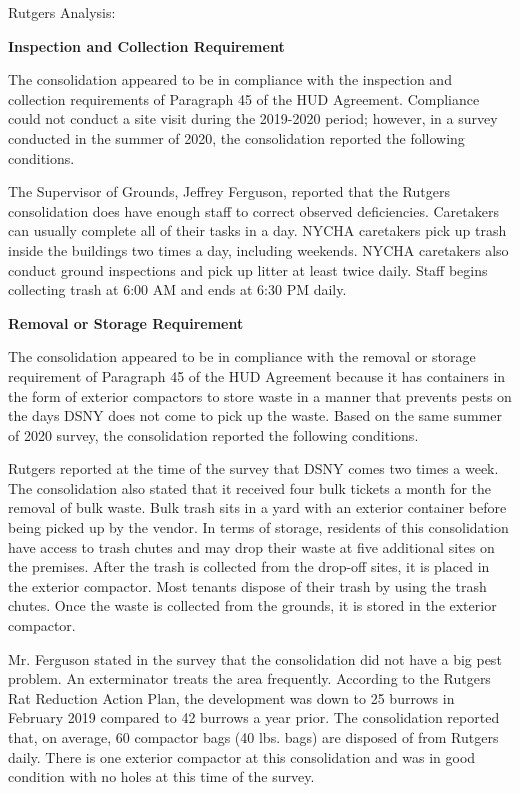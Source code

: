 Rutgers Analysis: 

\textbf{Inspection and Collection Requirement} 

 

The consolidation appeared to be in compliance with the inspection and collection requirements of Paragraph 45 of the HUD Agreement. Compliance could not conduct a site visit during the 2019-2020 period; however, in a survey conducted in the summer of 2020, the consolidation reported the following conditions.

The Supervisor of Grounds, Jeffrey Ferguson, reported that the Rutgers consolidation does have enough staff to correct observed deficiencies. Caretakers can usually complete all of their tasks in a day. NYCHA caretakers pick up trash inside the buildings two times a day, including weekends. NYCHA caretakers also conduct ground inspections and pick up litter at least twice daily. Staff begins collecting trash at 6:00 AM and ends at 6:30 PM daily. 

\textbf{Removal or Storage Requirement} 

The consolidation appeared to be in compliance with the removal or storage requirement of Paragraph  45 of the HUD Agreement because it has containers in the form of exterior compactors to store waste in a manner that prevents pests on the days DSNY does not come to pick up the waste. Based on the same summer of  2020  survey, the consolidation reported the following conditions.

Rutgers reported at the time of the survey that DSNY comes two times a week. The consolidation also stated that it received four bulk tickets a month for the removal of bulk waste.  Bulk trash sits in a yard with an exterior container before being picked up by the vendor.  In terms of storage, residents of this consolidation have access to trash chutes and may drop their waste at five additional sites on the premises. After the trash is collected from the drop-off sites, it is placed in the exterior compactor. Most tenants dispose of their trash by using the trash chutes. Once the waste is collected from the grounds, it is stored in the exterior compactor.  

 

Mr. Ferguson stated in the survey that the consolidation did not have a big pest problem. An exterminator treats the area frequently. According to the Rutgers Rat Reduction Action Plan, the development was down to 25 burrows in February 2019 compared to 42 burrows a year prior. The consolidation reported that, on average, 60 compactor bags (40 lbs. bags)  are disposed of from Rutgers daily. There is one exterior compactor at this consolidation and was in good condition with no holes at this time of the survey.

